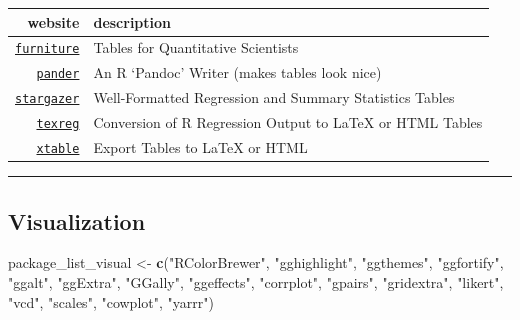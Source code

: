 \documentclass[]{book}
\newenvironment{Shaded}{\begin{snugshade}}{\end{snugshade}}
\newcommand{\KeywordTok}[1]{\textcolor[rgb]{0.13,0.29,0.53}{\textbf{#1}}}
\newcommand{\StringTok}[1]{\textcolor[rgb]{0.31,0.60,0.02}{#1}}
\newcommand{\NormalTok}[1]{#1}
\theoremstyle{definition}
\theoremstyle{definition}
\theoremstyle{definition}
\theoremstyle{remark}
\begin{document}
\begin{longtable}[]{@{}rl@{}}
\toprule
website & description\tabularnewline
\midrule
\endhead
\href{http://tysonbarrett.com/furniture/}{\texttt{furniture}} & Tables
for Quantitative Scientists\tabularnewline
\href{https://rapporter.github.io/pander/}{\texttt{pander}} & An R
`Pandoc' Writer (makes tables look nice)\tabularnewline
\href{https://www.jakeruss.com/cheatsheets/stargazer/}{\texttt{stargazer}}
& Well-Formatted Regression and Summary Statistics Tables\tabularnewline
\href{https://diffuseprior.wordpress.com/2013/01/20/texreg-a-package-for-beautiful-and-easily-customizable-latex-regression-tables-from-r/}{\texttt{texreg}}
& Conversion of R Regression Output to LaTeX or HTML
Tables\tabularnewline
\href{https://cran.r-project.org/web/packages/xtable/vignettes/xtableGallery.pdf}{\texttt{xtable}}
& Export Tables to LaTeX or HTML\tabularnewline
\bottomrule
\end{longtable}

\begin{center}\rule{0.5\linewidth}{\linethickness}\end{center}

\subsection{Visualization}\label{visualization}

\begin{Shaded}
\begin{Highlighting}[]
\NormalTok{package_list_visual <-}\StringTok{ }\KeywordTok{c}\NormalTok{(}\StringTok{"RColorBrewer"}\NormalTok{,}
                         \StringTok{"gghighlight"}\NormalTok{,}
                         \StringTok{"ggthemes"}\NormalTok{, }
                         \StringTok{"ggfortify"}\NormalTok{,}
                         \StringTok{"ggalt"}\NormalTok{,}
                         \StringTok{"ggExtra"}\NormalTok{,}
                         \StringTok{"GGally"}\NormalTok{, }
                         \StringTok{"ggeffects"}\NormalTok{, }
                         \StringTok{"corrplot"}\NormalTok{,}
                         \StringTok{"gpairs"}\NormalTok{,}
                         \StringTok{"gridextra"}\NormalTok{,}
                         \StringTok{"likert"}\NormalTok{,}
                         \StringTok{"vcd"}\NormalTok{,}
                         \StringTok{"scales"}\NormalTok{,}
                         \StringTok{"cowplot"}\NormalTok{,}
                         \StringTok{"yarrr"}\NormalTok{)}
\end{Highlighting}
\end{Shaded}
\end{document}
